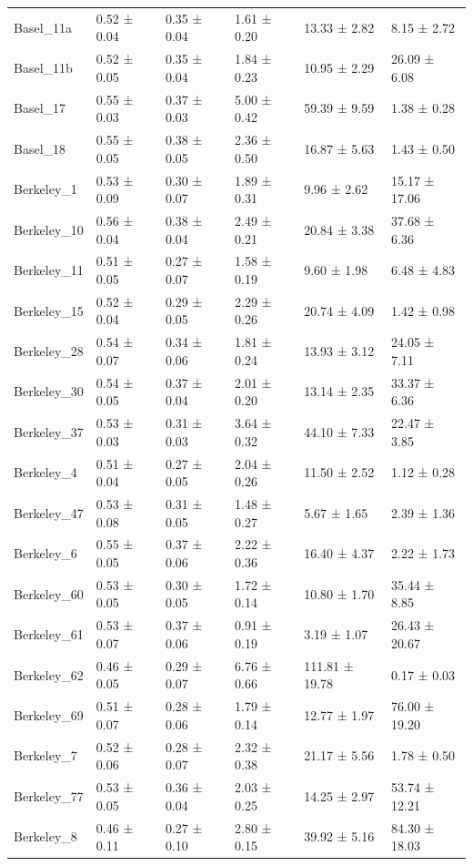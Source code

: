 \begin{tabular}{llllll}
Basel_11a & 0.52 ± 0.04 & 0.35 ± 0.04 & 1.61 ± 0.20 & 13.33 ± 2.82 & 8.15 ± 2.72 \\
Basel_11b & 0.52 ± 0.05 & 0.35 ± 0.04 & 1.84 ± 0.23 & 10.95 ± 2.29 & 26.09 ± 6.08 \\
Basel_17 & 0.55 ± 0.03 & 0.37 ± 0.03 & 5.00 ± 0.42 & 59.39 ± 9.59 & 1.38 ± 0.28 \\
Basel_18 & 0.55 ± 0.05 & 0.38 ± 0.05 & 2.36 ± 0.50 & 16.87 ± 5.63 & 1.43 ± 0.50 \\
Berkeley_1 & 0.53 ± 0.09 & 0.30 ± 0.07 & 1.89 ± 0.31 & 9.96 ± 2.62 & 15.17 ± 17.06 \\
Berkeley_10 & 0.56 ± 0.04 & 0.38 ± 0.04 & 2.49 ± 0.21 & 20.84 ± 3.38 & 37.68 ± 6.36 \\
Berkeley_11 & 0.51 ± 0.05 & 0.27 ± 0.07 & 1.58 ± 0.19 & 9.60 ± 1.98 & 6.48 ± 4.83 \\
Berkeley_15 & 0.52 ± 0.04 & 0.29 ± 0.05 & 2.29 ± 0.26 & 20.74 ± 4.09 & 1.42 ± 0.98 \\
Berkeley_28 & 0.54 ± 0.07 & 0.34 ± 0.06 & 1.81 ± 0.24 & 13.93 ± 3.12 & 24.05 ± 7.11 \\
Berkeley_30 & 0.54 ± 0.05 & 0.37 ± 0.04 & 2.01 ± 0.20 & 13.14 ± 2.35 & 33.37 ± 6.36 \\
Berkeley_37 & 0.53 ± 0.03 & 0.31 ± 0.03 & 3.64 ± 0.32 & 44.10 ± 7.33 & 22.47 ± 3.85 \\
Berkeley_4 & 0.51 ± 0.04 & 0.27 ± 0.05 & 2.04 ± 0.26 & 11.50 ± 2.52 & 1.12 ± 0.28 \\
Berkeley_47 & 0.53 ± 0.08 & 0.31 ± 0.05 & 1.48 ± 0.27 & 5.67 ± 1.65 & 2.39 ± 1.36 \\
Berkeley_6 & 0.55 ± 0.05 & 0.37 ± 0.06 & 2.22 ± 0.36 & 16.40 ± 4.37 & 2.22 ± 1.73 \\
Berkeley_60 & 0.53 ± 0.05 & 0.30 ± 0.05 & 1.72 ± 0.14 & 10.80 ± 1.70 & 35.44 ± 8.85 \\
Berkeley_61 & 0.53 ± 0.07 & 0.37 ± 0.06 & 0.91 ± 0.19 & 3.19 ± 1.07 & 26.43 ± 20.67 \\
Berkeley_62 & 0.46 ± 0.05 & 0.29 ± 0.07 & 6.76 ± 0.66 & 111.81 ± 19.78 & 0.17 ± 0.03 \\
Berkeley_69 & 0.51 ± 0.07 & 0.28 ± 0.06 & 1.79 ± 0.14 & 12.77 ± 1.97 & 76.00 ± 19.20 \\
Berkeley_7 & 0.52 ± 0.06 & 0.28 ± 0.07 & 2.32 ± 0.38 & 21.17 ± 5.56 & 1.78 ± 0.50 \\
Berkeley_77 & 0.53 ± 0.05 & 0.36 ± 0.04 & 2.03 ± 0.25 & 14.25 ± 2.97 & 53.74 ± 12.21 \\
Berkeley_8 & 0.46 ± 0.11 & 0.27 ± 0.10 & 2.80 ± 0.15 & 39.92 ± 5.16 & 84.30 ± 18.03 \\

\end{tabular}
